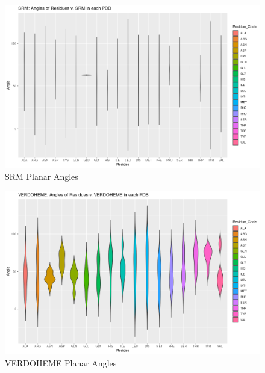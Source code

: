 	\begin{figure}
		\caption{SRM Planar Angles}
		\label{figs:SRM_planarAngles}
		\includegraphics[width=\linewidth]{7A/SRM_planarAngles}
	\end{figure}
	
	\begin{figure}
		\caption{VERDOHEME Planar Angles}
		\label{figs:VERDOHEME_planarAngles}
		\includegraphics[width=\linewidth]{7A/VERDOHEME_planarAngles}
	\end{figure}
	
